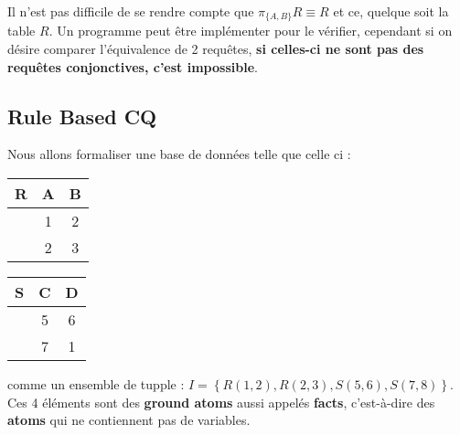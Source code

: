 \documentclass{article}
\begin{document}
\noindent Il n'est pas difficile de se rendre compte que $\pi_{\{A,B\}} R \equiv R$ et ce, quelque soit la table $R$. Un programme peut être implémenter pour le vérifier, 
cependant si on désire comparer l'équivalence de 2 requêtes, \textbf{si celles-ci ne sont pas des requêtes conjonctives, c'est impossible}.

\subsection{Rule Based CQ}

\noindent Nous allons formaliser une base de données telle que celle ci : 
\begin{center}
\begin{multicols}{2}
	\begin{tabular}{r|cc}
	R&A&B\\
	\hline
    & 1 & 2\\
	& 2 & 3 \\
	\end{tabular}
	\begin{tabular}{r|cc}
	S&C&D\\
	\hline
	& 5 & 6\\
	& 7 & 1\\
	\end{tabular}
\end{multicols}
\end{center}

comme un ensemble de tupple : $I= \left\{ R(1,2),R(2,3),S(5,6),S(7,8)\right\}$. Ces 4 éléments sont des \textbf{ground atoms} aussi appelés \textbf{facts}, c'est-à-dire des 
\textbf{atoms} qui ne contiennent pas de variables.\\
\end{document}
